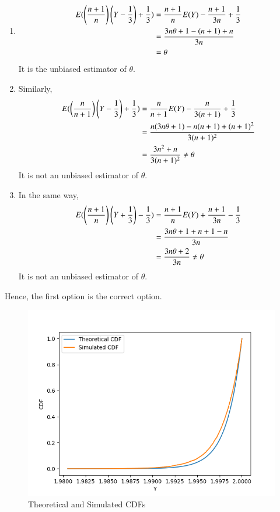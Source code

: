 \documentclass{article}[]
\begin{document}
\begin{enumerate}
\item
{
\begin{align}
E(\left(\frac{n+1}{n}\right)\left(Y-\frac{1}{3}\right) + \frac{1}{3}) &= \frac{n+1}{n}E(Y)-\frac{n+1}{3n} + \frac{1}{3}\\
&=\frac{3n\theta+1-(n+1)+n}{3n}\\
&=\theta
\end{align}
It is the unbiased estimator of $\theta$.
}
\item
{
Similarly,
\begin{align}
E(\left(\frac{n}{n+1}\right)\left(Y-\frac{1}{3}\right) + \frac{1}{3})&=\frac{n}{n+1}E(Y) - \frac{n}{3(n+1)} + \frac{1}{3}\\
&=\frac{n(3n\theta+1) - n(n+1) + (n+1)^2}{3(n+1)^2}\\
&=\frac{3n^2+n}{3(n+1)^2} \neq \theta
\end{align}
It is not an unbiased estimator of $\theta$.
}
\item
{
In the same way,
\begin{align}
E(\left(\frac{n+1}{n}\right)\left(Y+\frac{1}{3}\right) - \frac{1}{3})&=\frac{n+1}{n}E(Y) + \frac{n+1}{3n} - \frac{1}{3}\\
&=\frac{3n\theta+1+n+1-n}{3n}\\
&=\frac{3n\theta+2}{3n} \neq \theta
\end{align}
It is not an unbiased estimator of $\theta$.
}
\end{enumerate}
Hence, the first option is the correct option.

\begin{figure}[H]
\centering
\includegraphics{figs/estimations.png}
\caption{Theoretical and Simulated CDFs}
\label{ST:24.2023}
\end{figure}
\end{document}
